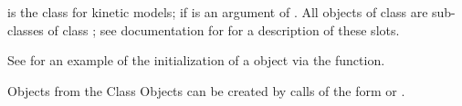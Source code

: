 \documentclass{article}
\begin{document}
\begin{Description}\relax
{} is the class for kinetic models; if  is an 
argument of .
All objects of class  are sub-classes of 
class ; see documentation for  
for a description of 
these slots.
\end{Description}
\begin{Details}\relax
See  for an 
example of the initialization of a 
 object via the  function.
\end{Details}
\begin{Section}{Objects from the Class}
Objects can be created by calls of the form  or 
.
\end{Section}
\end{document}

